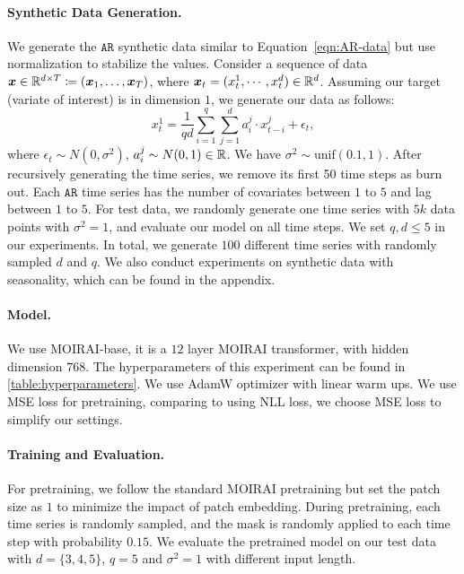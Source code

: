 \paragraph{Synthetic Data Generation.}
We generate the $\mathtt{AR}$ synthetic data similar to Equation~\eqref{eqn:AR-data} but use normalization to stabilize the values.
Consider a sequence of data 
$\bm{x} \in \mathbb{R}^{d \times T} \coloneqq (\bm{x}_1, \dots, \bm{x}_T)$, where $\bm{x}_t = (x_t^1, \cdots, x_t^d) \in \mathbb{R}^d$.
Assuming our target (variate of interest) is in dimension $1$, we generate our data as follows:
\begin{equation}
    x_{t}^1
    =
    \frac{1}{qd}
    \sum_{i=1}^q
    \sum_{j=1}^d
    a_i^j \cdot x_{t-i}^j
    + \epsilon_t
    ,
\end{equation}
where $\epsilon_t \sim N(0, \sigma^2)$, $a_i^j \sim N(0, 1) \in \mathbb{R}$.
We have $\sigma^2 \sim \text{unif}(0.1, 1)$.
After recursively generating the time series, we remove its first 50 time steps as burn out.
Each $\mathtt{AR}$ time series has the number of covariates between $1$ to $5$ and lag between $1$ to $5$.
For test data, we randomly generate one time series with $5k$ data points with $\sigma^2 = 1$, and evaluate our model on all time steps.
We set $q, d \leq 5$ in our experiments.
In total, we generate $100$ different time series with randomly sampled $d$ and $q$.
We also conduct experiments on synthetic data with seasonality, which can be found in the appendix.
\paragraph{Model.}
We use MOIRAI-base, it is a $12$ layer MOIRAI transformer, with hidden dimension $768$.
The hyperparameters of this experiment can be found in \cref{table:hyperparameters}.
We use AdamW optimizer with linear warm ups.
We use MSE loss for pretraining, comparing to \cite{woo2024unified} using NLL loss, we choose MSE loss to simplify our settings.
\paragraph{Training and Evaluation.}
For pretraining, we follow the standard MOIRAI pretraining but set the patch size as $1$ to minimize the impact of patch embedding.
During pretraining, each time series is randomly sampled, and the mask is randomly applied to each time step with probability $0.15$.
We evaluate the pretrained model on our test data with $d = \{3, 4, 5\}$, $q=5$ and $\sigma^2 = 1$ with different input length.
